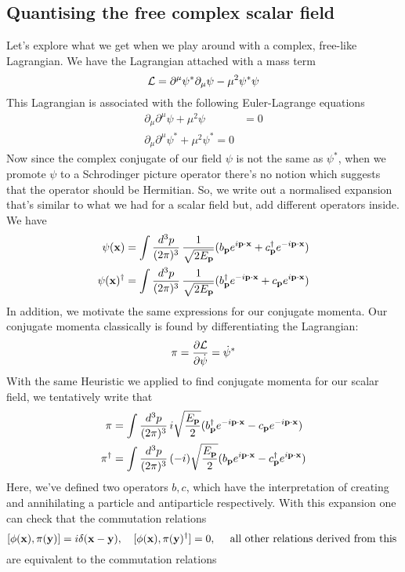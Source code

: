 \subsection{Quantising the free complex scalar field} 
Let's explore what we get when we play around with a complex, free-like Lagrangian. We have the Lagrangian attached with a mass term
\[ 
\mathcal{L} = \partial^\mu \psi^* \partial _\mu \psi - \mu^2 \psi^* \psi 
\] This Lagrangian is associated with the following Euler-Lagrange equations 
\begin{align*} 	
\partial_\mu \partial^\mu \psi + \mu^2 \psi &= 0 \\
\partial_\mu \partial^\mu \psi^* + \mu^2 \psi^* = 0 
\end{align*} 
Now since the complex conjugate of our field $\psi$ is not the same as $\psi^*$, when we promote $\psi$ to a Schrodinger picture operator there's no notion which suggests that the operator should be Hermitian. So, we write out a normalised expansion that's similar to what we had for a scalar field but, add different operators inside. We have 
\begin{align*} 
\psi( \mathbf{  x } ) = \int \frac{ d^3 p }{ (2 \pi)^3 } \, \frac{ 1 }{ \sqrt{ 2 E_{\mathbf{ p }} } } (  b _\mathbf{ p } e^{ i \mathbf{ p } \cdot \mathbf{x} }  + c_\mathbf{ p }^\dagger e^{ - i \mathbf{ p } \cdot \mathbf{x} }) \\
\psi(\mathbf{  x } )^\dagger  = \int \frac{ d^3 p }{ (2 \pi)^3 } \, \frac{ 1 }{ \sqrt{ 2 E_{\mathbf{ p }} } } ( b_\mathbf{ p}^\dagger e^{ - i \mathbf{ p } \cdot \mathbf{x} }  + c_\mathbf{ p} e^{ i \mathbf{ p } \cdot \mathbf{x} } ) \\
\end{align*} In addition, we motivate the same expressions for our conjugate momenta. Our conjugate momenta classically is found by differentiating the Lagrangian: 
\[ 	
\pi = \frac{ \partial \mathcal{L} }{ \partial \dot{ \psi } }  = \dot{ \psi}^* 
\] With the same Heuristic we applied to find conjugate momenta for our scalar field, we tentatively write that 
\begin{align*} 
\pi & = \int \frac{ d^3 p }{ (2 \pi)^3 } \, i \sqrt{ \frac{ E_{\mathbf{  p  }} }{ 2 } } ( b _\mathbf{ p }^\dagger e^{ - i \mathbf{ p } \cdot \mathbf{x} }  - c_\mathbf{ p } e^{ - i \mathbf{  p  } \cdot \mathbf{x} })  \\
\pi^\dagger &= \int \frac{ d^3 p }{ (2 \pi)^3 } \, ( -i ) \sqrt{ \frac{ E_{\mathbf{  p }} } { 2} } ( b_\mathbf{ p} e^{ i \mathbf{ p } \cdot \mathbf{x} }  - c_\mathbf{ p}^\dagger e^{ i \mathbf{  p } \cdot \mathbf{x} } ) 
\end{align*} Here, we've defined two operators $b, c$, which have the interpretation of creating and annihilating a particle and antiparticle respectively. 
With this expansion one can check that the commutation relations 
\[ 
[ \phi ( \mathbf{  x }), \pi (\mathbf{  y  }) ] = i \delta( \mathbf{  x - y  } ), \quad [ \phi ( \mathbf{ x }), \pi (\mathbf{  y  })^\dagger ]  = 0, \quad \text{ all other relations derived from this } 
\] are equivalent to the commutation relations 
